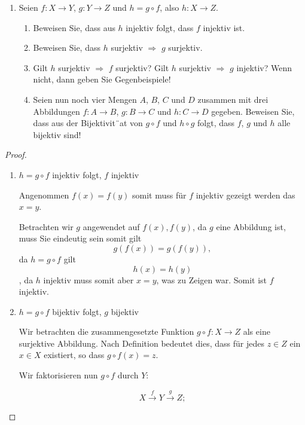 \documentclass{../problemset}
\begin{document}
\pagebreak

\begin{problem}
\begin{enumerate}
	\item Seien $f: X \to Y$, $g: Y \to Z$ und $h = g \circ f$, also $h: X \to Z$.
	      \begin{enumerate}
		      \item Beweisen Sie, dass aus $h$ injektiv folgt, dass $f$ injektiv ist.
		      \item Beweisen Sie, dass $h$ surjektiv $\Rightarrow$ $g$ surjektiv.
		      \item Gilt $h$ surjektiv $\Rightarrow$ $f$ surjektiv? Gilt $h$ surjektiv $\Rightarrow$ $g$ injektiv? Wenn nicht, dann geben Sie Gegenbeispiele!
		      \item Seien nun noch vier Mengen $A$, $B$, $C$ und $D$ zusammen mit drei Abbildungen $f: A \to B$, $g: B \to C$ und $h: C \to D$ gegeben. Beweisen Sie, dass aus der Bijektivit¨at von $g \circ f$ und $h \circ g$ folgt, dass $f$, $g$ und $h$ alle bijektiv sind!
	      \end{enumerate}

\end{enumerate}

\begin{proof}
	\begin{enumerate}
		\item $h = g \circ f$ injektiv folgt, $f$ injektiv

		      Angenommen $f(x) = f(y)$ somit muss für $f$ injektiv gezeigt werden das $x = y$.

		      Betrachten wir $g$ angewendet auf $f(x), f(y)$, da $g$ eine Abbildung ist, muss Sie eindeutig sein somit gilt \[
			      g(f(x)) = g(f(y)),
		      \] da $h = g \circ f$ gilt \[
			      h(x) = h(y)
		      \], da $h$ injektiv muss somit aber $x = y$, was zu Zeigen war. Somit ist $f$ injektiv. \checkmark

		\item $h = g \circ f$ bijektiv folgt, $g$ bijektiv

		      Wir betrachten die zusammengesetzte Funktion \(g \circ f: X \to Z\) als eine surjektive Abbildung. Nach Definition bedeutet dies, dass für jedes \(z \in Z\) ein \(x \in X\) existiert, so dass \(g \circ f(x) = z\).

		      Wir faktorisieren nun \(g \circ f\) durch \(Y\):

		      \[ X \overset{f}{\to} Y \overset{g}{\to} Z; \]


\end{enumerate}
\end{proof}
\end{problem}
\end{document}
